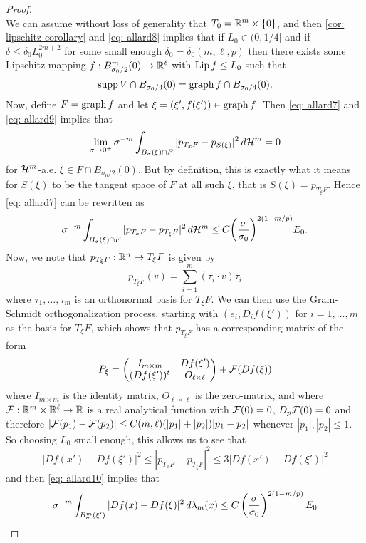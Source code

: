 \begin{proof}
\begin{equation}
\end{equation}
We can assume without loss of generality that $T_0 = \mathbb{R}^m \times \{0\}$, and then \cref{cor: lipschitz corollary} and \eqref{eq: allard8} implies that if $L_0 \in (0,1/4]$ and if $\delta \le \delta_0 L_0^{2m+2}$ for some small enough $\delta_0 = \delta_0(m, \ell, p)$ then there exists some Lipschitz mapping $f:B^m_{\sigma_0/2}(0) \to \mathbb{R}^{\ell}$ with $\operatorname{Lip} f \le L_0$ such that
\begin{equation}
    \operatorname{supp} V \cap B_{\sigma_0/4}(0) = \operatorname{graph} f \cap B_{\sigma_0/4}(0).\label{eq: allard9}
\end{equation}
Now, define $F = \operatorname{graph} f$ and let $\xi = (\xi', f(\xi')) \in \operatorname{graph} f$. Then \eqref{eq: allard7} and \eqref{eq: allard9} implies that
\[
    \lim_{\sigma \to 0^+} \sigma^{-m} \int_{B_{\sigma}(\xi) \cap F} |p_{T_x F} - p_{S(\xi)}|^2 \, d\mathcal{H}^m = 0
\]
for $\mathcal{H}^m$-a.e. $\xi \in F \cap B_{\sigma_0/2}(0)$. But by definition, this is exactly what it means for $S(\xi)$ to be the tangent space of $F$ at all such $\xi$, that is $S(\xi)=p_{T_{\xi}F}$. Hence \eqref{eq: allard7} can be rewritten as
\begin{equation}
    \sigma^{-m} \int_{B_{\sigma}(\xi) \cap F} |p_{T_xF} - p_{T_{\xi}F}|^2 \, d\mathcal{H}^m \le C{\left(\frac{\sigma}{\sigma_0}\right)}^{2(1-m/p)}E_0. \label{eq: allard10}
\end{equation}
Now, we note that $p_{T_{\xi}F}:\mathbb{R}^n \to T_{\xi}F$ is given by
\[
    p_{T_{\xi}F}(v) = \sum_{i=1}^m (\tau_i \cdot v) \tau_i
\]
where $\tau_1, \dots, \tau_m$ is an orthonormal basis for $T_{\xi}F$. We can then use the Gram-Schmidt orthogonalization process, starting with $(e_i, D_if(\xi'))$ for $i=1, \dots, m$ as the basis for $T_{\xi}F$, which shows that $p_{T_{\xi}F}$ has a corresponding matrix of the form
\[
    P_{\xi} = \begin{pmatrix}
        I_{m \times m} & Df(\xi') \\
        (Df(\xi'))^t   & O_{\ell \times \ell}
    \end{pmatrix} + \mathcal{F}(Df(\xi))
\]
where $I_{m \times m}$ is the identity matrix, $O_{\ell \times \ell}$ is the zero-matrix, and where $\mathcal{F}:\mathbb{R}^{m}\times \mathbb{R}^{\ell}\to \mathbb{R}$ is a real analytical function with $\mathcal{F}(0)=0$, $D_p\mathcal{F}(0)=0$ and therefore $|\mathcal{F}(p_1) - \mathcal{F}(p_2)| \le C(m, \ell)(|p_1| + |p_2|)|p_1-p_2|$ whenever $|p_1|,|p_2| \le 1$. So choosing $L_0$ small enough, this allows us to see that
\[
    |Df(x') - Df(\xi')|^2 \le |p_{T_xF} - p_{T_{\xi}F}|^2 \le 3|Df(x') - Df(\xi')|^2
\]
and then \eqref{eq: allard10} implies that
\[
    \sigma^{-m} \int_{B^m_{\sigma}(\xi')} |Df(x) - Df(\xi)|^2\, d\lambda_m(x) \le C\left(\frac{\sigma}{\sigma_0}\right)^{2(1-m/p)}E_0
\]
\end{proof}
